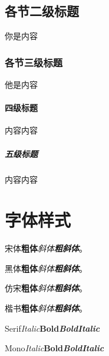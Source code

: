 \subsection{各节二级标题}
你是内容

\subsubsection{各节三级标题}
他是内容

\paragraph{四级标题}
内容内容

\subparagraph{五级标题}
内容内容

\section{字体样式}
宋体\quad \textbf{粗体}\quad \textit{斜体}\quad \textbf{\textit{粗斜体}}。

{\heiti 黑体\quad \textbf{粗体}\quad \textit{斜体}\quad \textbf{\textit{粗斜体}}}。

{\fangsong 仿宋\quad \textbf{粗体}\quad \textit{斜体}\quad \textbf{\textit{粗斜体}}}。

{\kaishu 楷书\quad \textbf{粗体}\quad \textit{斜体}\quad \textbf{\textit{粗斜体}}}。

Serif\quad \textit{Italic}\quad \textbf{Bold}\quad \textbf{\textit{BoldItalic}}


{\ttfamily Mono\quad \textit{Italic}\quad \textbf{Bold}\quad \textbf{\textit{BoldItalic}}}

